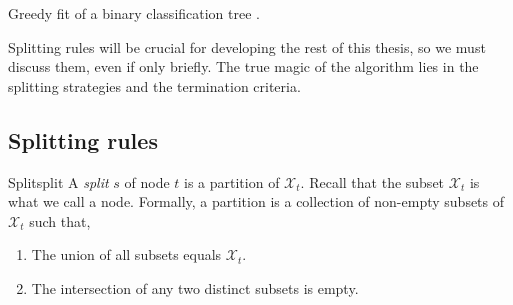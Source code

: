 \begin{algorithm}
    \caption[Greedy tree fitting algorithm]{Greedy fit of a binary
        classification tree \cite[Ch.~3.3]{louppe2014}.}
    \label{alg:tree-fit}
\end{algorithm}

Splitting rules will be crucial for developing the rest of this thesis, so we
must discuss them, even if only briefly. The true magic of the algorithm lies in
the splitting strategies and the termination criteria.

\subsection{Splitting rules}

\begin{dfn}{Split}{split}
    A \emph{split} $s$ of node $t$ is a partition of $\mathcal{X}_t$. Recall
    that the subset $\mathcal{X}_t$ is what we call a node. Formally, a
    partition is a collection of non-empty subsets of $\mathcal{X}_t$ such that,
    \begin{enumerate}
        \item The union of all subsets equals $\mathcal{X}_t$.
        \item The intersection of any two distinct subsets is empty.
    \end{enumerate}
\end{dfn}

